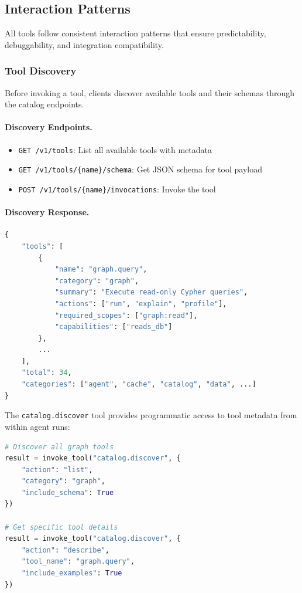 \subsection{Interaction Patterns}
\label{subsec:interaction-patterns}

All tools follow consistent interaction patterns that ensure predictability, debuggability, and integration compatibility.

\subsubsection{Tool Discovery}

Before invoking a tool, clients discover available tools and their schemas through the catalog endpoints.

\paragraph{Discovery Endpoints.}
\begin{itemize}
    \item \texttt{GET /v1/tools}: List all available tools with metadata
    \item \texttt{GET /v1/tools/\{name\}/schema}: Get JSON schema for tool payload
    \item \texttt{POST /v1/tools/\{name\}/invocations}: Invoke the tool
\end{itemize}

\paragraph{Discovery Response.}
\begin{lstlisting}[language=Python, caption={Tool discovery response structure}, label={lst:tool-discovery-response}]
{
    "tools": [
        {
            "name": "graph.query",
            "category": "graph",
            "summary": "Execute read-only Cypher queries",
            "actions": ["run", "explain", "profile"],
            "required_scopes": ["graph:read"],
            "capabilities": ["reads_db"]
        },
        ...
    ],
    "total": 34,
    "categories": ["agent", "cache", "catalog", "data", ...]
}
\end{lstlisting}

The \texttt{catalog.discover} tool provides programmatic access to tool metadata from within agent runs:

\begin{lstlisting}[language=Python, caption={Using catalog.discover tool}, label={lst:catalog-discover}]
# Discover all graph tools
result = invoke_tool("catalog.discover", {
    "action": "list",
    "category": "graph",
    "include_schema": True
})

# Get specific tool details
result = invoke_tool("catalog.discover", {
    "action": "describe",
    "tool_name": "graph.query",
    "include_examples": True
})
\end{lstlisting}

